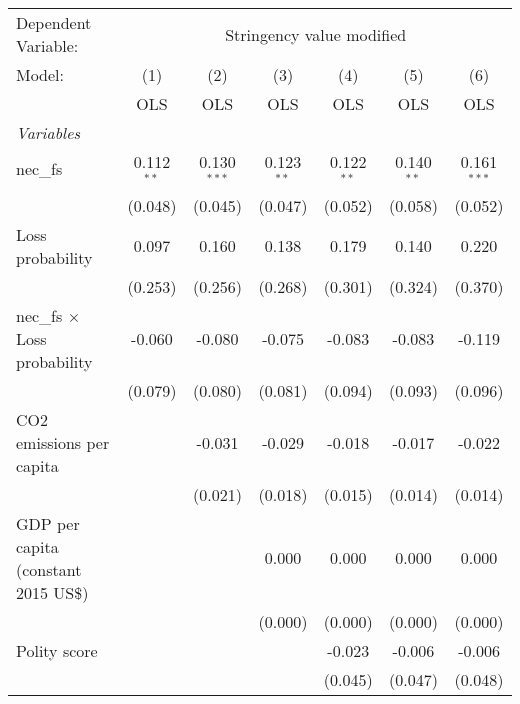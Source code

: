 
\begingroup
\centering
\begin{tabular}{lcccccc}
   \toprule
   Dependent Variable: & \multicolumn{6}{c}{Stringency value modified}\\
   Model:                               & (1)          & (2)           & (3)          & (4)          & (5)          & (6)\\  
                                        &  OLS         & OLS           & OLS          & OLS          & OLS          & OLS\\  
   \midrule
   \emph{Variables}\\
   nec\_fs                              & 0.112$^{**}$ & 0.130$^{***}$ & 0.123$^{**}$ & 0.122$^{**}$ & 0.140$^{**}$ & 0.161$^{***}$\\   
                                        & (0.048)      & (0.045)       & (0.047)      & (0.052)      & (0.058)      & (0.052)\\   
   Loss probability                     & 0.097        & 0.160         & 0.138        & 0.179        & 0.140        & 0.220\\   
                                        & (0.253)      & (0.256)       & (0.268)      & (0.301)      & (0.324)      & (0.370)\\   
   nec\_fs $\times$ Loss probability    & -0.060       & -0.080        & -0.075       & -0.083       & -0.083       & -0.119\\   
                                        & (0.079)      & (0.080)       & (0.081)      & (0.094)      & (0.093)      & (0.096)\\   
   CO2 emissions per capita             &              & -0.031        & -0.029       & -0.018       & -0.017       & -0.022\\   
                                        &              & (0.021)       & (0.018)      & (0.015)      & (0.014)      & (0.014)\\   
   GDP per capita (constant 2015 US\$)  &              &               & 0.000        & 0.000        & 0.000        & 0.000\\   
                                        &              &               & (0.000)      & (0.000)      & (0.000)      & (0.000)\\   
   Polity score                         &              &               &              & -0.023       & -0.006       & -0.006\\   
                                        &              &               &              & (0.045)      & (0.047)      & (0.048)\\   

\end{tabular}
